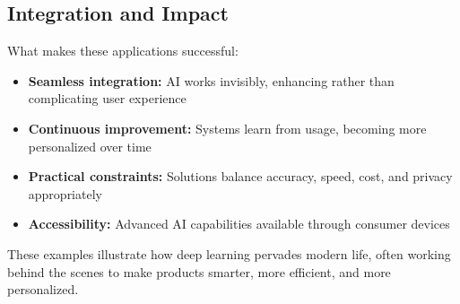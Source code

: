 \subsection{Integration and Impact}

What makes these applications successful:
\begin{itemize}
    \item \textbf{Seamless integration:} AI works invisibly, enhancing rather than complicating user experience
    \item \textbf{Continuous improvement:} Systems learn from usage, becoming more personalized over time
    \item \textbf{Practical constraints:} Solutions balance accuracy, speed, cost, and privacy appropriately
    \item \textbf{Accessibility:} Advanced AI capabilities available through consumer devices
\end{itemize}

These examples illustrate how deep learning pervades modern life, often working behind the scenes to make products smarter, more efficient, and more personalized.

